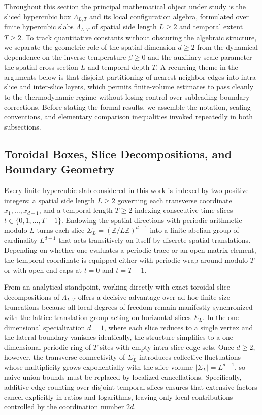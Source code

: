\documentclass[11pt]{article}
\theoremstyle{definition}
\begin{document}
Throughout this section the principal mathematical object under study is the sliced
hypercubic box $\Lambda_{L,T}$ and its local configuration algebra, formulated over
finite hypercubic slabs $\Lambda_{L,T}$ of spatial side length $L \ge 2$ and
temporal extent $T \ge 2$. To track quantitative constants without obscuring the
algebraic structure, we separate the geometric role of the spatial dimension $d \ge
2$ from the dynamical dependence on the inverse temperature $\beta \ge 0$ and the
auxiliary scale parameter the spatial cross-section $L$ and temporal depth $T$. A
recurring theme in the arguments below is that disjoint partitioning of
nearest-neighbor edges into intra-slice and inter-slice layers, which permits
finite-volume estimates to pass cleanly to the thermodynamic regime without losing
control over subleading boundary corrections. Before stating the formal results, we
assemble the notation, scaling conventions, and elementary comparison inequalities
invoked repeatedly in both subsections.

\subsection{Toroidal Boxes, Slice Decompositions, and Boundary Geometry}
\label{subsec:s01a}

Every finite hypercubic slab considered in this work is indexed by two positive
integers: a spatial side length $L \ge 2$ governing each transverse coordinate $x_1,
\dots, x_{d-1}$, and a temporal length $T \ge 2$ indexing consecutive time slices $t
\in \{0, 1, \dots, T-1\}$. Endowing the spatial directions with periodic arithmetic
modulo $L$ turns each slice $\Sigma_L = (\mathbb{Z}/L\mathbb{Z})^{d-1}$ into a
finite abelian group of cardinality $L^{d-1}$ that acts transitively on itself by
discrete spatial translations. Depending on whether one evaluates a periodic trace
or an open matrix element, the temporal coordinate is equipped either with periodic
wrap-around modulo $T$ or with open end-caps at $t = 0$ and $t = T - 1$.

From an analytical standpoint, working directly with exact toroidal slice
decompositions of $\Lambda_{L,T}$ offers a decisive advantage over ad hoc
finite-size truncations because all local degrees of freedom remain manifestly
synchronized with the lattice translation group acting on horizontal slices
$\Sigma_L$. In the one-dimensional specialization $d = 1$, where each slice reduces
to a single vertex and the lateral boundary vanishes identically, the structure
simplifies to a one-dimensional periodic ring of $T$ sites with empty intra-slice
edge sets. Once $d \ge 2$, however, the transverse connectivity of $\Sigma_L$
introduces collective fluctuations whose multiplicity grows exponentially with the
slice volume $|\Sigma_L| = L^{d-1}$, so naive union bounds must be replaced by
localized cancellations. Specifically, additive edge counting over disjoint temporal
slices ensures that extensive factors cancel explicitly in ratios and logarithms,
leaving only local contributions controlled by the coordination number $2d$.
\end{document}
